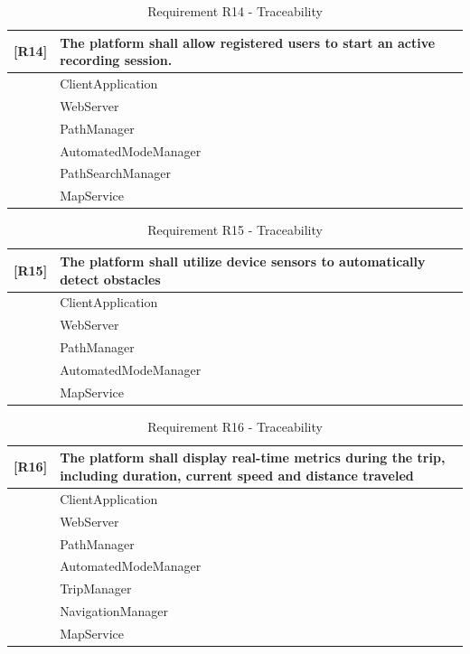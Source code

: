 \begin{table}[H]
    \centering
    \begin{tabular}{|p{1cm}|p{14cm}|}
    \hline
    \textbf{[R14]} & \textbf{The platform shall allow registered users to start an active recording session.} \\ \hline
    [C1] & ClientApplication \\ \hline
    [C2] & WebServer \\ \hline
    [C7] & PathManager \\ \hline
    [C8] & AutomatedModeManager \\ \hline
    [C10] & PathSearchManager \\ \hline
    [E2] & MapService \\ \hline
    \end{tabular}
    \caption{Requirement R14 - Traceability}
    \label{tab:RT14}
\end{table}

\begin{table}[H]
    \centering
    \begin{tabular}{|p{1cm}|p{14cm}|}
    \hline
    \textbf{[R15]} & \textbf{The platform shall utilize device sensors to automatically detect obstacles} \\ \hline
    [C1] & ClientApplication \\ \hline
    [C2] & WebServer \\ \hline
    [C7] & PathManager \\ \hline
    [C8] & AutomatedModeManager \\ \hline
    [E2] & MapService \\ \hline
    \end{tabular}
    \caption{Requirement R15 - Traceability}
    \label{tab:RT15}
\end{table}

\begin{table}[H]
    \centering
    \begin{tabular}{|p{1cm}|p{14cm}|}
    \hline
    \textbf{[R16]} & \textbf{The platform shall display real-time metrics during the trip, including duration, current speed and
    distance traveled} \\ \hline
    [C1] & ClientApplication \\ \hline
    [C2] & WebServer \\ \hline
    [C7] & PathManager \\ \hline
    [C8] & AutomatedModeManager \\ \hline
    [C11] & TripManager \\ \hline
    [C13] & NavigationManager \\ \hline
    [E2] & MapService \\ \hline
    \end{tabular}
    \caption{Requirement R16 - Traceability}
    \label{tab:RT16}
\end{table}

